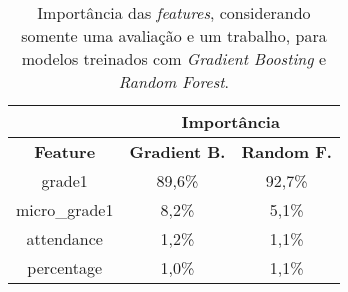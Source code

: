 \begin{table}[!htb]
    \centering
    \caption{Importância das \textit{features}, considerando somente uma avaliação e um trabalho, para modelos treinados com \textit{Gradient Boosting} e \textit{Random Forest}.}
    \begin{tabular}{@{}ccc@{}}
    \textbf{} & \multicolumn{2}{c}{\textbf{Importância}} \\ \midrule
    \textbf{Feature} & \textbf{Gradient B.} & \textbf{Random F.} \\ \midrule
        grade1  & 89,6\%  & 92,7\% \\
        micro\_grade1  & 8,2\%  & 5,1\% \\
        attendance  & 1,2\%  & 1,1\% \\ 
        percentage  & 1,0\%  & 1,1\% \\ \bottomrule
    \end{tabular}
    \label{tab:importanciaUmaProva}
\end{table}